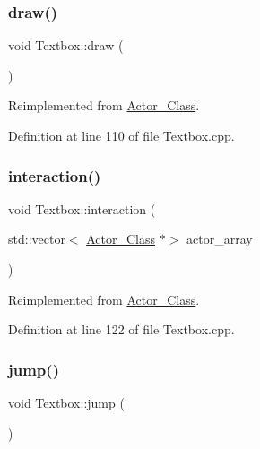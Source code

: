 \hypertarget{class_textbox_a164e6dfbd1964b36b05de0cf84d07abf}{}\label{class_textbox_a164e6dfbd1964b36b05de0cf84d07abf} 
\subsubsection{\texorpdfstring{draw()}{draw()}}
{\footnotesize\ttfamily void Textbox\+::draw (\begin{DoxyParamCaption}{ }\end{DoxyParamCaption})\hspace{0.3cm}{\ttfamily [virtual]}}



Reimplemented from \hyperlink{class_actor___class_ac49cd62be76b4b950ecbe155413f1b64}{Actor\+\_\+\+Class}.



Definition at line 110 of file Textbox.\+cpp.

\hypertarget{class_textbox_a67dd5640da6bbd88affded4a37ede098}{}\label{class_textbox_a67dd5640da6bbd88affded4a37ede098} 
\subsubsection{\texorpdfstring{interaction()}{interaction()}}
{\footnotesize\ttfamily void Textbox\+::interaction (\begin{DoxyParamCaption}\item[{std\+::vector$<$ \hyperlink{class_actor___class}{Actor\+\_\+\+Class} $\ast$$>$}]{actor\+\_\+array }\end{DoxyParamCaption})\hspace{0.3cm}{\ttfamily [virtual]}}



Reimplemented from \hyperlink{class_actor___class_a87d1e079d8576fa99592a60b38a04a1b}{Actor\+\_\+\+Class}.



Definition at line 122 of file Textbox.\+cpp.

\hypertarget{class_textbox_a995336eb1a269216afb4dcd187e39d0b}{}\label{class_textbox_a995336eb1a269216afb4dcd187e39d0b} 
\subsubsection{\texorpdfstring{jump()}{jump()}}
{\footnotesize\ttfamily void Textbox\+::jump (\begin{DoxyParamCaption}{ }\end{DoxyParamCaption})\hspace{0.3cm}{\ttfamily [virtual]}}



